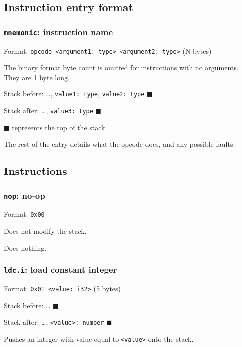 \subsection{Instruction entry format}

\subsubsection{\texorpdfstring{\texttt{mnemonic}: instruction
name}{mnemonic: instruction name}}

Format:
\texttt{opcode\ \textless{}argument1:\ type\textgreater{}\ \textless{}argument2:\ type\textgreater{}}
(N bytes)

The binary format byte count is omitted for instructions with no
arguments. They are 1 byte long.

Stack before: \ldots, \texttt{value1:\ type}, \texttt{value2:\ type}
\(\blacksquare\)

Stack after: \ldots, \texttt{value3:\ type} \(\blacksquare\)

\(\blacksquare\) represents the top of the stack.

The rest of the entry details what the opcode does, and any possible
faults.

\subsection{Instructions}

\subsubsection{\texorpdfstring{\texttt{nop}: no-op}{nop: no-op}}

Format: \texttt{0x00}

Does not modify the stack.

Does nothing.

\subsubsection{\texorpdfstring{\texttt{ldc.i}: load constant
integer}{ldc.i: load constant integer}}

Format: \texttt{0x01\ \textless{}value:\ i32\textgreater{}} (5 bytes)

Stack before: \ldots{} \(\blacksquare\)

Stack after: \ldots, \texttt{\textless{}value\textgreater{}:\ number}
\(\blacksquare\)

Pushes an integer with value equal to
\texttt{\textless{}value\textgreater{}} onto the stack.

